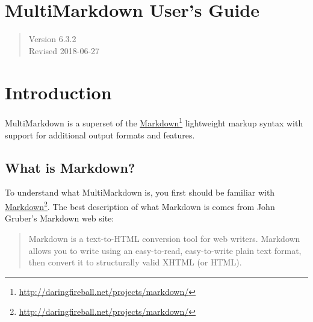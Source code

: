 
\def\mytitle{MultiMarkdown User's Guide}
\def\latextitle{MultiMarkdown \\ User's Guide}
\def\myauthor{Fletcher T. Penney}
\def\version{6.3.2}
\def\revised{2018-06-27}
\def\uuid{88e8f53c-9a02-4e49-a639-f2dbb0a2e338}




\chapter{MultiMarkdown User's Guide }
\label{title}

\begin{quote}
Version 6.3.2\\
Revised 2018-06-27
\end{quote}

\tableofcontents

\chapter{Introduction }
\label{introduction}

MultiMarkdown is a superset of the \href{http://daringfireball.net/projects/markdown/}{Markdown}\footnote{\href{http://daringfireball.net/projects/markdown/}{http:\slash \slash daringfireball.net\slash projects\slash markdown\slash }} lightweight markup syntax with support for additional output formats and features.

\section{What is Markdown? }
\label{whatismarkdown}

To understand what MultiMarkdown is, you first should be familiar with
\href{http://daringfireball.net/projects/markdown/}{Markdown}\footnote{\href{http://daringfireball.net/projects/markdown/}{http:\slash \slash daringfireball.net\slash projects\slash markdown\slash }}. The best description of what Markdown is comes from John Gruber's
Markdown web site:

\begin{quote}
Markdown is a text-to-HTML conversion tool for web writers. Markdown
allows you to write using an easy-to-read, easy-to-write plain text
format, then convert it to structurally valid XHTML (or HTML).
\end{quote}

